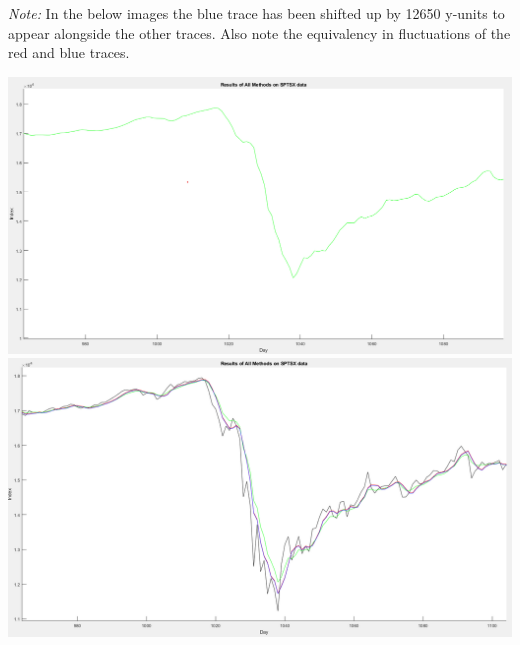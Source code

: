\documentclass[]{report}
\begin{document}
	\textit{Note:} In the below images the blue trace has been shifted up by 12650 y-units to appear alongside the other traces. Also note the equivalency in fluctuations of the red and blue traces.
	
	\newpage
	
	\begin{center}
		\includegraphics[scale=0.3]{comparison1}
		\includegraphics[scale=0.3]{comparison2}
	\end{center}
	
\end{document}
